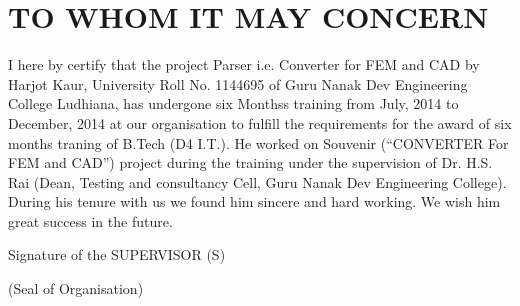 \section*{TO WHOM IT MAY CONCERN }                        
I here by certify that the  project  Parser i.e. Converter for FEM and CAD by Harjot Kaur, University Roll No. 1144695  of Guru Nanak Dev Engineering College Ludhiana, has undergone six Monthss training from July, 2014 to December,
2014 at our organisation to fulfill the requirements for the award of six months traning
of B.Tech (D4 I.T.). He worked on Souvenir (“CONVERTER For FEM and CAD”) project
during the training under the supervision of Dr. H.S. Rai (Dean, Testing and consultancy
Cell, Guru Nanak Dev Engineering College). During his tenure with us we found him
sincere and hard working. We wish him great success in the future.
\student
\noindent
\author {Harjot Kaur}
\supervisor
\noindent 
\teacher
\noindent
{Signature of the SUPERVISOR (S)}

\Department
\noindent


\stamp
\noindent
(Seal of Organisation)
